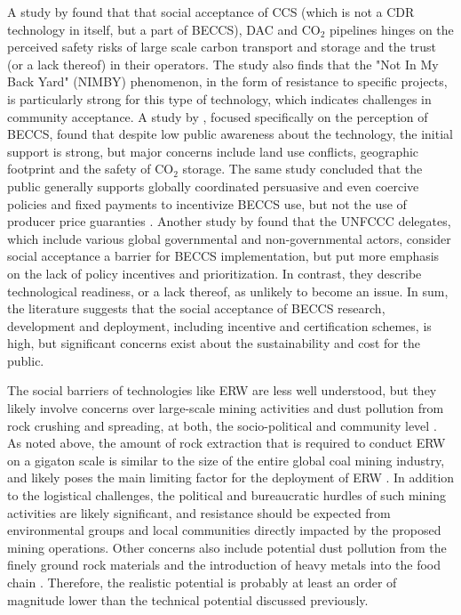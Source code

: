 A study by \textcite{karytsas_transnational_2023} found that that social acceptance of CCS (which is not a CDR technology in itself, but a part of BECCS), DAC and CO$_2$ pipelines hinges on the perceived safety risks of large scale carbon transport and storage and the trust (or a lack thereof) in their operators. The study also finds that the "Not In My Back Yard" (NIMBY) phenomenon, in the form of resistance to specific projects, is particularly strong for this type of technology, which indicates challenges in community acceptance. A study by \textcite{bellamy_perceptions_2019}, focused specifically on the perception of BECCS, found that despite low public awareness about the technology, the initial support is strong, but major concerns include land use conflicts, geographic footprint and the safety of CO$_2$ storage. The same study concluded that the public generally supports globally coordinated persuasive and even coercive policies and fixed payments to incentivize BECCS use, but not the use of producer price guaranties \parencite{bellamy_perceptions_2019}. Another study by \textcite{fridahl_bioenergy_2018} found that the UNFCCC delegates, which include various global governmental and non-governmental actors, consider social acceptance a barrier for BECCS implementation, but put more emphasis on the lack of policy incentives and prioritization. In contrast, they describe technological readiness, or a lack thereof, as unlikely to become an issue. In sum, the literature suggests that the social acceptance of BECCS research, development and deployment, including incentive and certification schemes, is high, but significant concerns exist about the sustainability and cost for the public.\vspace{2mm}

The social barriers of technologies like ERW are less well understood, but they likely involve concerns over large-scale mining activities and dust pollution from rock crushing and spreading, at both, the socio-political and community level \parencite{manning_enhanced_2025, madankan_larger_2025}. As noted above, the amount of rock extraction that is required to conduct ERW on a gigaton scale is similar to the size of the entire global coal mining industry, and likely poses the main limiting factor for the deployment of ERW \parencite{hangx_coastal_2009}. In addition to the logistical challenges, the political and bureaucratic hurdles of such mining activities are likely significant, and resistance should be expected from environmental groups and local communities directly impacted by the proposed mining operations. Other concerns also include potential dust pollution from the finely ground rock materials and the introduction of heavy metals into the food chain \parencite{yao_life_2025, schiedung_uncertainties_2026}. Therefore, the realistic potential is probably at least an order of magnitude lower than the technical potential discussed previously.\vspace{2mm}

